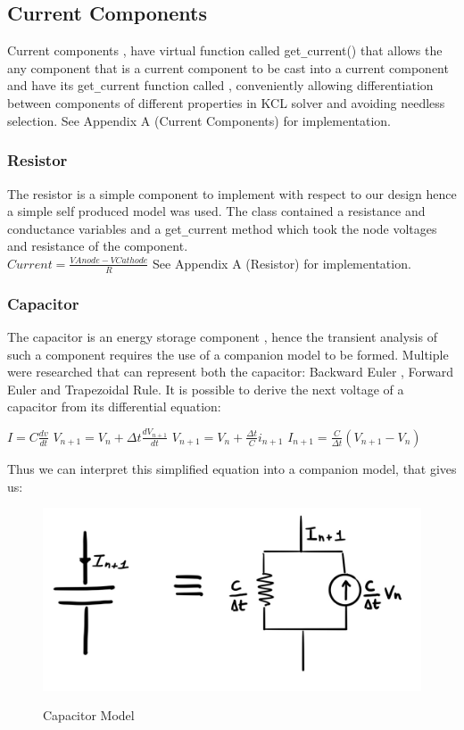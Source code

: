 \documentclass{article}
\begin{document}
\subsection{Current Components}
Current components , have virtual function called get\verb|_|current() that allows the any component that is a current component to be cast into a current component and have its get\verb|_|current function called , conveniently allowing differentiation between components of different properties in KCL solver and avoiding needless selection.
\bigbreak
See Appendix A (Current Components) for implementation.
\medbreak


\subsubsection{Resistor}
The resistor is a simple component to implement with respect to our design hence a simple self produced model was used. The class contained a resistance and conductance variables and a get\verb|_|current method which took the node voltages and resistance of the component. \bigbreak\\$Current = \frac{VAnode - VCathode}{R}$
\bigbreak
See Appendix A (Resistor) for implementation.
\newpage
\subsubsection{Capacitor}
The capacitor is an energy storage component , hence the transient analysis of such a component requires the use of a companion model to be formed. Multiple were researched that can represent both the capacitor: Backward Euler , Forward Euler and Trapezoidal Rule. It is possible to derive the next voltage of a capacitor from its differential equation:
\bigbreak

$I = C\frac{dv}{dt}$
\medbreak
$V_{n+1} = V_n + \Delta t\frac{dV_{n+1}}{dt}$
\medbreak
$V_{n+1} = V_n + \frac{\Delta t}{C}i_{n+1}$
\medbreak
$I_{n+1} = \frac{C}{\Delta t}(V_{n+1}-V_n)$
\bigbreak

Thus we can interpret this simplified equation into a companion model, that gives us: 

\bigbreak

\begin{figure}[h]
    \caption{Capacitor Model}
    \centering
    \includegraphics[width=\textwidth]{images/CapModel.jpg}
    \label{fig:CapModel}
\end{figure}
\end{document}
